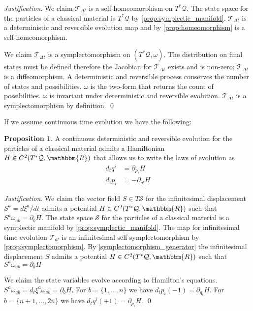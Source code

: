 \documentclass[aps,pra,10pt,twocolumn,floatfix,nofootinbib]{revtex4-1}
\numberwithin{equation}{section}
\theoremstyle{definition}
\newtheorem{prop}[equation]{Proposition}
\newenvironment{justification}{\emph{Justification}.}{\qed}
\begin{document}
\begin{justification}
	We claim $\mathcal{T}_{\Delta t}$ is a self-homeomorphism on $T^*\mathcal{Q}$. The state space for the particles of a classical material is $T^*\mathcal{Q}$ by \ref{prop:symplectic_manifold}. $\mathcal{T}_{\Delta t}$ is a deterministic and reversible evolution map and by \ref{prop:homeomorphism} is a self-homeomorphism.
	
	We claim $\mathcal{T}_{\Delta t}$ is a symplectomorphism on $(T^*\mathcal{Q}, \omega)$. The distribution on final states must be defined  therefore the Jacobian for $\mathcal{T}_{\Delta t}$ exists and is non-zero: $\mathcal{T}_{\Delta t}$ is a diffeomorphism. A deterministic and reversible process conserves the number of states and possibilities. $\omega$ is the two-form that returns the count of possibilities. $\omega$ is invariant under deterministic and reversible evolution. $\mathcal{T}_{\Delta t}$ is a symplectomorphism by definition.
\end{justification}

If we assume continuous time evolution we have the following:

\begin{prop}\label{prop:hamiltons_equations}
	A continuous deterministic and reversible evolution for the particles of a classical material admits a Hamiltonian $H \in C^2(T^*\mathcal{Q}, \mathbbm{R})$ that allows us to write the laws of evolution as
\begin{align*}
d_{t}q^i &= \partial_{p_i} H \\
d_{t}p_i &= - \partial_{q^i} H
\end{align*}
\end{prop}

\begin{justification}
We claim the vector field $S \in T\mathcal{S}$ for the infinitesimal displacement $S^a = d\xi^a/dt$ admits a potential $H \in C^2(T^*\mathcal{Q}, \mathbbm{R})$ such that $S^{a} \omega_{ab} = \partial_{b}H$. The state space $\mathcal{S}$ for the particles of a classical material is a symplectic manifold by \ref{prop:symplectic_manifold}. The map for infinitesimal time evolution $\mathcal{T}_{dt}$ is an infinitesimal self-symplectomorphism by \ref{prop:symplectomorphism}. By \ref{symplectomorphism_generator} the infinitesimal displacement $S$ admits a potential $H \in C^2(T^*\mathcal{Q}, \mathbbm{R})$ such that $S^{a} \omega_{ab} = \partial_{b}H$

We claim the state variables evolve according to Hamilton's equations. $S^{a} \omega_{ab} = d_t\xi^a \omega_{ab} = \partial_{b}H$. For $b=\{1,...,n\}$ we have $d_tp_i (-1) = \partial_{q_i} H$. For $b=\{n+1,...,2n\}$ we have $d_tq^i (+1) = \partial_{p_i} H$.
\end{justification}
\end{document}
